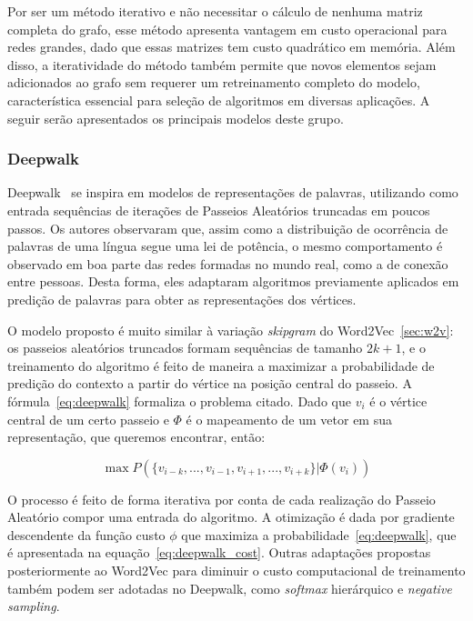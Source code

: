 Por ser um método iterativo e não necessitar o cálculo de nenhuma matriz completa
do grafo, esse método apresenta vantagem em custo operacional para redes
grandes, dado que essas matrizes tem custo quadrático em memória.
Além disso, a iteratividade do método também permite que novos elementos sejam
adicionados ao grafo sem requerer um retreinamento completo do modelo,
característica essencial para seleção de algoritmos em diversas aplicações.
A seguir serão apresentados os principais modelos deste grupo.

\subsubsection{Deepwalk}

Deepwalk~\cite{perozzi14} se inspira em modelos de representações de palavras,
utilizando como entrada sequências de iterações de Passeios Aleatórios truncadas
em poucos passos.
Os autores observaram que, assim como a distribuição de ocorrência de palavras de
uma língua segue uma lei de potência, o mesmo comportamento é observado em boa
parte das redes formadas no mundo real, como a de conexão entre pessoas.
Desta forma, eles adaptaram algoritmos previamente aplicados em predição de
palavras para obter as representações dos vértices.

O modelo proposto é muito similar à variação \textit{skipgram} do
Word2Vec~\ref{sec:w2v}: os passeios aleatórios truncados formam sequências de
tamanho $2k + 1$, e o treinamento do algoritmo é feito de maneira a maximizar a
probabilidade de predição do contexto a partir do vértice na posição central do
passeio.
A fórmula~\ref{eq:deepwalk} formaliza o problema citado.
Dado que $v_i$ é o vértice central de um certo passeio e $\Phi$ é o mapeamento
de um vetor em sua representação, que queremos encontrar, então:

\begin{equation} \label{eq:deepwalk}
    \operatorname{max} P(\{v_{i-k},...,v_{i-1},v_{i+1},...,v_{i+k}\}|\Phi(v_i))
\end{equation}

O processo é feito de forma iterativa por conta de cada realização do Passeio
Aleatório compor uma entrada do algoritmo.
A otimização é dada por gradiente descendente da função custo $\phi$ que maximiza
a probabilidade~\ref{eq:deepwalk}, que é apresentada na
equação~\ref{eq:deepwalk_cost}.
Outras adaptações propostas posteriormente ao Word2Vec para diminuir o custo
computacional de treinamento também podem ser adotadas no Deepwalk, como
\textit{softmax} hierárquico e \textit{negative sampling}.


